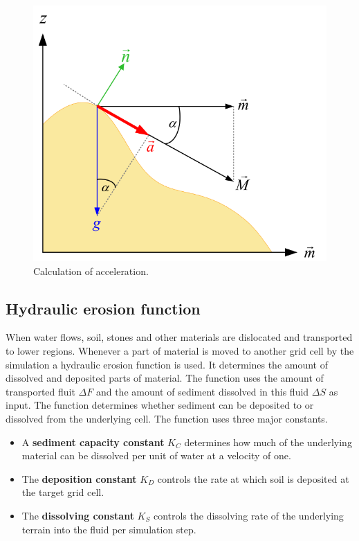 \begin{figure}[htb]
	\centering
	\includegraphics[width=.8\linewidth]{NWD05/acceleration}
	\caption{Calculation of acceleration.}
	\label{fig:calc_acceleration}
\end{figure}

\subsection{Hydraulic erosion function}
When water flows, soil, stones and other materials are dislocated and transported to lower regions. Whenever a part of material is moved to another grid cell by the simulation a hydraulic erosion function is used. It determines the amount of dissolved and deposited parts of material. The function uses the amount of transported fluit $\Delta F$ and the amount of sediment dissolved in this fluid $\Delta S$ as input. The function determines whether sediment can be deposited to or dissolved from the underlying cell. The function uses three major constants. 
\begin{itemize}
\item A \textbf{sediment capacity constant} $K_C$ determines how much of the underlying material can be dissolved per unit of water at a velocity of one. 
\item The \textbf{deposition constant} $K_D$ controls the rate at which soil is deposited at the target grid cell. 
\item The \textbf{dissolving constant} $K_S$ controls the dissolving rate of the underlying terrain into the fluid per simulation step.
\end{itemize}

